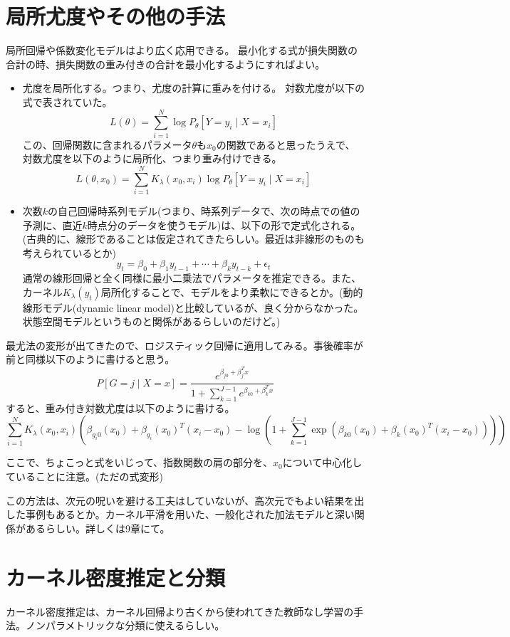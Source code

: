 \documentclass{jsarticle}
\begin{document}
\section{局所尤度やその他の手法}
局所回帰や係数変化モデルはより広く応用できる。
最小化する式が損失関数の合計の時、損失関数の重み付きの合計を最小化するようにすればよい。
\begin{itemize}
  \item 尤度を局所化する。つまり、尤度の計算に重みを付ける。
  対数尤度が以下の式で表されていた。
  \[
    L(\theta)=\sum_{i=1}^{N}\log P_{\theta}[Y=
    y_{i} \mid X=x_{i}]
  \]
  この、回帰関数に含まれるパラメータ$\theta$も$x_{0}$の関数であると思ったうえで、対数尤度を以下のように局所化、つまり重み付けできる。
  \[
    L(\theta,x_{0})=\sum_{i=1}^{N}K_{\lambda}(x_{0},x_{i})\log P_{\theta}[Y=
    y_{i} \mid X=x_{i}]
  \]

  \item 次数$k$の自己回帰時系列モデル(つまり、時系列データで、次の時点での値の予測に、直近$k$時点分のデータを使うモデル)は、以下の形で定式化される。(古典的に、線形であることは仮定されてきたらしい。最近は非線形のものも考えられているとか)
  \[
    y_{t}=\beta_{0}+\beta_{1}y_{t-1}+\cdots+\beta_{k}y_{t-k}+\epsilon_{t}
  \]
  通常の線形回帰と全く同様に最小二乗法でパラメータを推定できる。また、カーネル$K_{\lambda}(y_{t})$局所化することで、モデルをより柔軟にできるとか。(動的線形モデル(dynamic linear model)と比較しているが、良く分からなかった。状態空間モデルというものと関係があるらしいのだけど。)
\end{itemize}

最尤法の変形が出てきたので、ロジスティック回帰に適用してみる。事後確率が前と同様以下のように書けると思う。
\[
  P[G=j \mid X=x]=\frac{e^{\beta_{j0}+\beta_{j}^{T}x}}{1+\sum_{k=1}^{J-1}e^{\beta_{k0}+\beta_{k}^{T}x}}
\]
すると、重み付き対数尤度は以下のように書ける。
\[
  \sum_{i=1}^{N}K_{\lambda}(x_{0},x_{i}) \left ( \beta_{g_{i}0}(x_{0})+\beta_{g_{i}}(x_{0})^{T}(x_{i}-x_{0})- \log \left ( 1+\sum_{k=1}^{J-1}\exp(\beta_{k0}(x_{0})+\beta_{k}(x_{0})^{T}(x_{i}-x_{0}) ) \right ) \right )
\]

ここで、ちょこっと式をいじって、指数関数の肩の部分を、$x_0$について中心化していることに注意。(ただの式変形)

この方法は、次元の呪いを避ける工夫はしていないが、高次元でもよい結果を出した事例もあるとか。カーネル平滑を用いた、一般化された加法モデルと深い関係があるらしい。詳しくは9章にて。

\section{カーネル密度推定と分類}
カーネル密度推定は、カーネル回帰より古くから使われてきた教師なし学習の手法。ノンパラメトリックな分類に使えるらしい。
\end{document}
